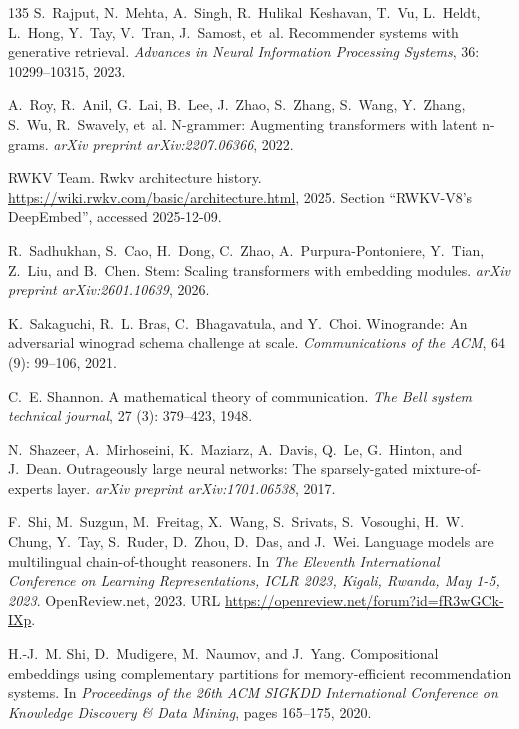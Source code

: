 \begin{thebibliography}{135}
S.~Rajput, N.~Mehta, A.~Singh, R.~Hulikal~Keshavan, T.~Vu, L.~Heldt, L.~Hong,
  Y.~Tay, V.~Tran, J.~Samost, et~al.
\newblock Recommender systems with generative retrieval.
\newblock \emph{Advances in Neural Information Processing Systems},
  36: 10299--10315, 2023.

A.~Roy, R.~Anil, G.~Lai, B.~Lee, J.~Zhao, S.~Zhang, S.~Wang, Y.~Zhang, S.~Wu,
  R.~Swavely, et~al.
\newblock N-grammer: Augmenting transformers with latent n-grams.
\newblock \emph{arXiv preprint arXiv:2207.06366}, 2022.

{RWKV Team}.
\newblock Rwkv architecture history.
\newblock \url{https://wiki.rwkv.com/basic/architecture.html}, 2025.
\newblock Section ``RWKV-V8's DeepEmbed'', accessed 2025-12-09.

R.~Sadhukhan, S.~Cao, H.~Dong, C.~Zhao, A.~Purpura-Pontoniere, Y.~Tian, Z.~Liu,
  and B.~Chen.
\newblock Stem: Scaling transformers with embedding modules.
\newblock \emph{arXiv preprint arXiv:2601.10639}, 2026.

K.~Sakaguchi, R.~L. Bras, C.~Bhagavatula, and Y.~Choi.
\newblock Winogrande: An adversarial winograd schema challenge at scale.
\newblock \emph{Communications of the ACM}, 64 (9): 99--106,
  2021.

C.~E. Shannon.
\newblock A mathematical theory of communication.
\newblock \emph{The Bell system technical journal}, 27 (3):
  379--423, 1948.

N.~Shazeer, A.~Mirhoseini, K.~Maziarz, A.~Davis, Q.~Le, G.~Hinton, and J.~Dean.
\newblock Outrageously large neural networks: The sparsely-gated
  mixture-of-experts layer.
\newblock \emph{arXiv preprint arXiv:1701.06538}, 2017.

F.~Shi, M.~Suzgun, M.~Freitag, X.~Wang, S.~Srivats, S.~Vosoughi, H.~W. Chung,
  Y.~Tay, S.~Ruder, D.~Zhou, D.~Das, and J.~Wei.
\newblock Language models are multilingual chain-of-thought reasoners.
\newblock In \emph{The Eleventh International Conference on Learning
  Representations, {ICLR} 2023, Kigali, Rwanda, May 1-5, 2023}. OpenReview.net,
  2023.
\newblock URL \url{https://openreview.net/forum?id=fR3wGCk-IXp}.

H.-J.~M. Shi, D.~Mudigere, M.~Naumov, and J.~Yang.
\newblock Compositional embeddings using complementary partitions for
  memory-efficient recommendation systems.
\newblock In \emph{Proceedings of the 26th ACM SIGKDD International Conference
  on Knowledge Discovery \& Data Mining}, pages 165--175, 2020.


\end{thebibliography}
